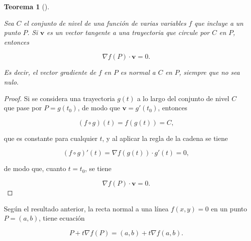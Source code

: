 \documentclass[
  a4paper,
]{scrreport}
\theoremstyle{definition}
\theoremstyle{plain}
\newtheorem{theorem}{Teorema}[chapter]
\theoremstyle{plain}
\theoremstyle{definition}
\theoremstyle{definition}
\theoremstyle{plain}
\theoremstyle{remark}
\begin{document}
\begin{theorem}[]\protect\hypertarget{thm-gradiente-normal-curvas-nivel}{}\label{thm-gradiente-normal-curvas-nivel}

Sea \(C\) el conjunto de nivel de una función de varias variables \(f\)
que incluye a un punto \(P\). Si \(\mathbf{v}\) es un vector tangente a
una trayectoria que circule por \(C\) en \(P\), entonces

\[
\nabla f(P) \cdot \mathbf{v} = 0.
\]

Es decir, el vector gradiente de \(f\) en \(P\) es normal a \(C\) en
\(P\), siempre que no sea nulo.

\end{theorem}

\begin{tcolorbox}[enhanced jigsaw, breakable, title=\textcolor{quarto-callout-note-color}{\faInfo}\hspace{0.5em}{Demostración}, toprule=.15mm, coltitle=black, arc=.35mm, rightrule=.15mm, colframe=quarto-callout-note-color-frame, colbacktitle=quarto-callout-note-color!10!white, toptitle=1mm, titlerule=0mm, leftrule=.75mm, opacityback=0, colback=white, bottomrule=.15mm, bottomtitle=1mm, left=2mm, opacitybacktitle=0.6]

\begin{proof}

Si se considera una trayectoria \(g(t)\) a lo largo del conjunto de
nivel \(C\) que pase por \(P=g(t_0)\), de modo que
\(\mathbf{v}=g'(t_0)\), entonces

\[
(f\circ g)(t) = f(g(t)) = C,
\]

que es constante para cualquier \(t\), y al aplicar la regla de la
cadena se tiene

\[
(f\circ g)'(t) = \nabla f(g(t))\cdot  g'(t) = 0,
\]

de modo que, cuanto \(t=t_0\), se tiene

\[
\nabla f(P)\cdot \mathbf{v} = 0.
\]

\end{proof}

\end{tcolorbox}

Según el resultado anterior, la recta normal a una línea \(f(x,y)=0\) en
un punto \(P=(a,b)\), tiene ecuación

\[
P+t\nabla f(P) = (a, b) + t \nabla f(a,b).
\]
\end{document}
